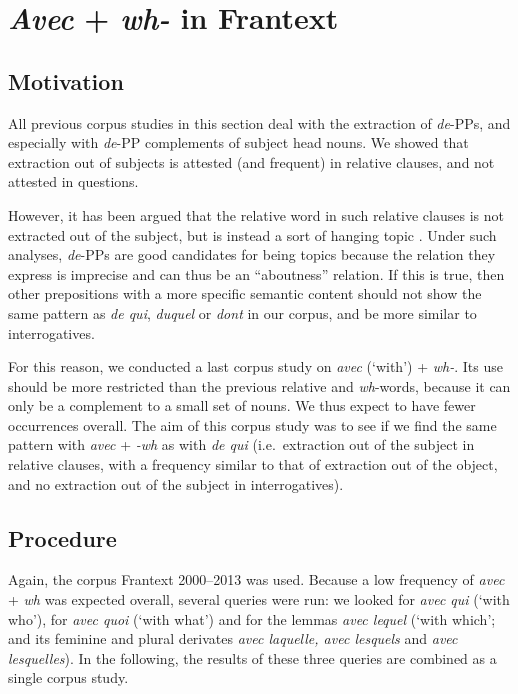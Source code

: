\section{\emph{Avec} + \emph{wh-} in Frantext}
\subsection{Motivation}

All previous corpus studies in this section deal with the extraction of \emph{de}-PPs, and especially with \emph{de}-PP complements of subject head nouns. We showed that extraction out of subjects is attested (and frequent) in relative clauses, and not attested in questions. 

However, it has been argued that the relative word in such relative clauses is not extracted out of the subject, but is instead a sort of hanging topic \citep{Jurka.2010,Uriagereka.2012}. Under such analyses, \emph{de}-PPs are good candidates for being topics because the relation they express is imprecise and can thus be an ``aboutness'' relation. 
If this is true, then other prepositions with a more specific semantic content should not show the same pattern as \emph{de qui}, \emph{duquel} or \emph{dont} in our corpus, and be more similar to interrogatives. 

For this reason, we conducted a last corpus study on \emph{avec} (`with') + \emph{wh-}. Its use should be more restricted than the previous relative and \emph{wh}-words, because it can only be a complement to a small set of nouns. We thus expect to have fewer occurrences overall. The aim of this corpus study was to see if we find the same pattern with \emph{avec} + \emph{-wh} as with \emph{de qui} (i.e.\ extraction out of the subject in relative clauses, with a frequency similar to that of extraction out of the object, and no extraction out of the subject in interrogatives).

\subsection{Procedure}

Again, the corpus Frantext 2000--2013 was used. Because a low frequency of \emph{avec} + \emph{wh} was expected overall, several queries were run: we looked for \emph{avec qui} (`with who'), for \emph{avec quoi} (`with what') and for the lemmas \emph{avec lequel} (`with which'; and its feminine and plural derivates \emph{avec laquelle, avec lesquels} and \emph{avec lesquelles}). In the following, the results of these three queries are combined as a single corpus study.\largerpage

